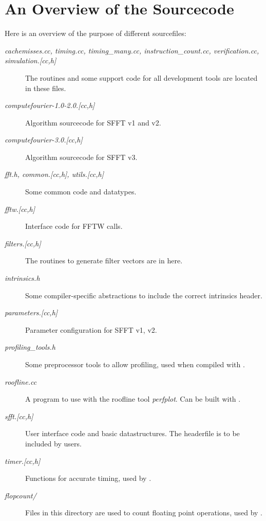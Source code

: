 \documentclass[letterpaper,10pt,english]{sphinxmanual}
\begin{document}
\section{An Overview of the Sourcecode}
\label{development:an-overview-of-the-sourcecode}
Here is an overview of the purpose of different sourcefiles:
\begin{description}
\item[{\emph{cachemisses.cc, timing.cc, timing\_many.cc, instruction\_count.cc, verification.cc, simulation.{[}cc,h{]}}}] \leavevmode
The  routines and some support code for all development tools
are located in these files.

\item[{\emph{computefourier-1.0-2.0.{[}cc,h{]}}}] \leavevmode
Algorithm sourcecode for SFFT v1 and v2.

\item[{\emph{computefourier-3.0.{[}cc,h{]}}}] \leavevmode
Algorithm sourcecode for SFFT v3.

\item[{\emph{fft.h, common.{[}cc,h{]}, utils.{[}cc,h{]}}}] \leavevmode
Some common code and datatypes.

\item[{\emph{fftw.{[}cc,h{]}}}] \leavevmode
Interface code for FFTW calls.

\item[{\emph{filters.{[}cc,h{]}}}] \leavevmode
The routines to generate filter vectors are in here.

\item[{\emph{intrinsics.h}}] \leavevmode
Some compiler-specific abstractions to include the correct intrinsics
header.

\item[{\emph{parameters.{[}cc,h{]}}}] \leavevmode
Parameter configuration for SFFT v1, v2.

\item[{\emph{profiling\_tools.h}}] \leavevmode
Some preprocessor tools to allow profiling, used when compiled with
.

\item[{\emph{roofline.cc}}] \leavevmode
A program to use with the roofline tool \emph{perfplot}. Can be built with
.

\item[{\emph{sfft.{[}cc,h{]}}}] \leavevmode
User interface code and basic datastructures. The headerfile is to be
included by users.

\item[{\emph{timer.{[}cc,h{]}}}] \leavevmode
Functions for accurate timing, used by .

\item[{\emph{flopcount/}}] \leavevmode
Files in this directory are used to count floating point operations, used
by .

\end{description}
\end{document}
